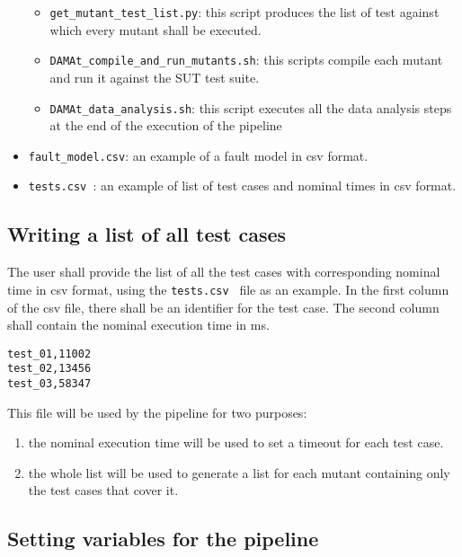\begin{itemize}
\begin{itemize}
		\item \texttt{get\_mutant\_test\_list.py}: this script produces the list of test against which every mutant shall be executed.
	  \item \texttt{DAMAt\_compile\_and\_run\_mutants.sh}: this scripts compile each mutant and run it against the SUT test suite.
		\item \texttt{DAMAt\_data\_analysis.sh}: this script executes all the data analysis steps at the end of the execution of the \DAMA pipeline
	\end{itemize}
	\item \texttt{fault\_model.csv}: an example of a \DAMA fault model in csv format.
 	\item \texttt{tests.csv }: an example of list of test cases and nominal times in csv format.
\end{itemize}

\subsection{Writing a list of all test cases}
\label{subsec:test_list}
The user shall provide the list of all the test cases with corresponding nominal time in csv format, using the \texttt{tests.csv } file as an example.
In the first column of the csv file, there shall be an identifier for the test case. The second column shall contain the nominal execution time in ms.

\begin{lstlisting}
test_01,11002
test_02,13456
test_03,58347
\end{lstlisting}

This file will be used by the \DAMA pipeline for two purposes:
\begin{enumerate}
	\item the nominal execution time will be used to set a timeout for each test case.
	\item the whole list will be used to generate a list for each mutant containing only the test cases that cover it.
\end{enumerate}

\subsection{Setting variables for the \DAMA pipeline}


